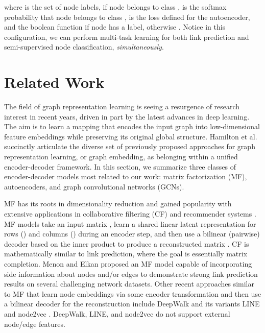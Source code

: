 \documentclass[letterpaper, conference]{IEEEtran}
\begin{document}
where  is the set of node labels,  if node  belongs to class ,  is the softmax probability that node  belongs to class ,  is the loss defined for the autoencoder, and the boolean function  if node  has a label, otherwise . Notice in this configuration, we can perform multi-task learning for both link prediction and semi-supervised node classification, \emph{simultaneously}.

\section{Related Work}

The field of graph representation learning is seeing a resurgence of research interest in recent years, driven in part by the latest advances in deep learning. The aim is to learn a mapping that encodes the input graph into low-dimensional feature embeddings while preserving its original global structure. Hamilton et al. \cite{Hamilton:2017} succinctly articulate the diverse set of previously proposed approaches for graph representation learning, or graph embedding, as belonging within a unified encoder-decoder framework. In this section, we summarize three classes of encoder-decoder models most related to our work: matrix factorization (MF), autoencoders, and graph convolutional networks (GCNs).

MF has its roots in dimensionality reduction and gained popularity with extensive applications in collaborative filtering (CF) and recommender systems \cite{Koren:2009}. MF models take an input matrix , learn a shared linear latent representation for rows () and columns () during an encoder step, and then use a bilinear (pairwise) decoder based on the inner product  to produce a reconstructed matrix . CF is mathematically similar to link prediction, where the goal is essentially matrix completion. Menon and Elkan \cite{Menon:2011} proposed an MF model capable of incorporating side information about nodes and/or edges to demonstrate strong link prediction results on several challenging network datasets. Other recent approaches similar to MF that learn node embeddings via some encoder transformation and then use a bilinear decoder for the reconstruction include DeepWalk \cite{Perozzi:2014} and its variants LINE \cite{Tang:2015} and node2vec \cite{Grover:2016}. DeepWalk, LINE, and node2vec do not support external node/edge features.
\end{document}
